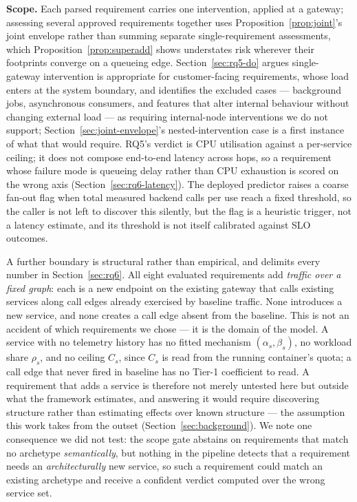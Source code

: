 \documentclass[journal, 10pt]{IEEEtran}
\begin{document}
\textbf{Scope.} Each parsed requirement carries one intervention, applied at a
gateway; assessing several approved requirements together uses
Proposition~\ref{prop:joint}'s joint envelope rather than summing separate
single-requirement assessments, which Proposition~\ref{prop:superadd} shows
understates risk wherever their footprints converge on a queueing edge.
Section~\ref{sec:rq5-do} argues single-gateway intervention is appropriate for
customer-facing requirements, whose load enters at the system boundary, and
identifies the excluded cases --- background jobs, asynchronous consumers, and
features that alter internal behaviour without changing external load --- as
requiring internal-node interventions we do not support; Section~\ref{sec:joint-envelope}'s
nested-intervention case is a first instance of what that would require. RQ5's
verdict is CPU utilisation against a per-service ceiling; it does not compose
end-to-end latency across hops, so a requirement whose failure mode is queueing
delay rather than CPU exhaustion is scored on the wrong axis
(Section~\ref{sec:rq6-latency}). The deployed predictor raises a coarse
fan-out flag when total measured backend calls per use reach a fixed
threshold, so the caller is not left to discover this silently, but the flag
is a heuristic trigger, not a latency estimate, and its threshold is not
itself calibrated against SLO outcomes.

A further boundary is structural rather than empirical, and delimits every
number in Section~\ref{sec:rq6}. All eight evaluated requirements add
\emph{traffic over a fixed graph}: each is a new endpoint on the existing
gateway that calls existing services along call edges already exercised by
baseline traffic. None introduces a new service, and none creates a call edge
absent from the baseline. This is not an accident of which requirements we
chose --- it is the domain of the model. A service with no telemetry history
has no fitted mechanism $(\alpha_s,\beta_s)$, no workload share $\rho_s$, and
no ceiling $C_s$, since $C_s$ is read from the running container's quota; a
call edge that never fired in baseline has no Tier-1 coefficient to read.
A requirement that adds a service is therefore not merely untested here but
outside what the framework estimates, and answering it would require
discovering structure rather than estimating effects over known structure ---
the assumption this work takes from the outset (Section~\ref{sec:background}).
We note one consequence we did not test: the scope gate abstains on
requirements that match no archetype \emph{semantically}, but nothing in the
pipeline detects that a requirement needs an \emph{architecturally} new
service, so such a requirement could match an existing archetype and receive a
confident verdict computed over the wrong service set.
\end{document}
